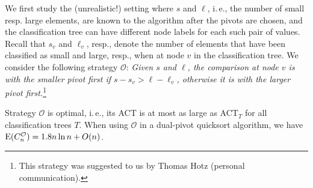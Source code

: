 \documentclass[prodmode,acmtalg]{acmsmall}
\newcommand{\E}{\textnormal{\textrm{E}}}
\begin{document}
We first study the
(unrealistic!)
setting where $s$ and $\ell$, i.\,e., the number of small resp. large elements, are
known to the algorithm after the pivots are chosen, and the classification tree can
have different node labels for each such pair of values.
Recall that
$s_v$ and $\ell_v$, resp., denote the number of
elements 
that have been classified as small and large, resp., when at node $v$ in the classification tree.
We consider the following
strategy $\mathcal{O}$: \emph{Given $s$ and $\ell$, the comparison at node $v$ is with
the smaller pivot first if $s - s_v > \ell - \ell_v$, otherwise it is
with the larger pivot
first.}\footnote{This strategy was suggested to us by Thomas Hotz (personal
communication).}

\begin{theorem}\label{thm:O:optimal}
    Strategy $\mathcal{O}$ is optimal, i.\,e., its ACT is at most as large as  ACT$_T$ for
all classification trees $T$. When using $\mathcal{O}$ in a dual-pivot quicksort
algorithm, we have $\E(C^\mathcal{O}_n) = 1.8 n \ln n + O(n)$.
\end{theorem}
\end{document}
